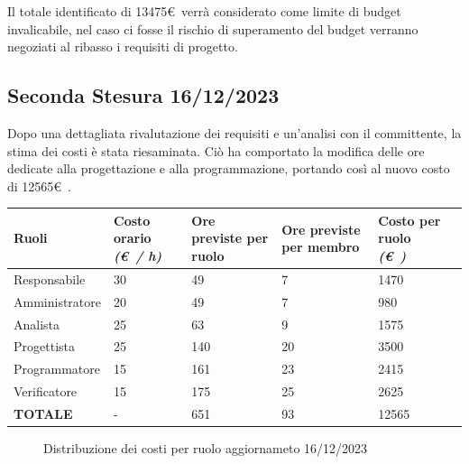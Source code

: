 \documentclass{article}
\begin{document}
    Il totale identificato di 13475\euro\ verrà considerato come limite di budget invalicabile,
    nel caso ci fosse il rischio di superamento del budget verranno negoziati al ribasso i requisiti
    di progetto.
\subsection{Seconda Stesura 16/12/2023}
Dopo una dettagliata rivalutazione dei requisiti e un'analisi con il committente, la stima dei costi è stata riesaminata. Ciò ha comportato la modifica delle ore dedicate alla progettazione e alla programmazione, portando così al nuovo costo di 12565\euro\ .
\begin{center}
        
    \begin{tabular}{|C{3cm}|C{2cm}|C{2cm}|C{2cm}|C{2cm}|C{2cm}|}
        \hline

        \textbf{Ruoli} & \textbf{Costo orario} \linebreak \textit{(\euro\ / h)} & \textbf{Ore previste per ruolo} & \textbf{Ore previste per membro} & \textbf{Costo per ruolo} \linebreak \textit{(\euro\ )} \\
        \hline\hline
        
        Responsabile & 30 & 49 & 7 & 1470 \\
        \hline
        
        Amministratore & 20 & 49 & 7 & 980 \\
        \hline
        
        Analista & 25 & 63 & 9 & 1575 \\
        \hline 
        
        Progettista & 25 & 140 & 20 & 3500 \\ 
        \hline
        
        Programmatore & 15 & 161 & 23 & 2415 \\
        \hline
        
        Verificatore & 15 & 175 & 25 & 2625 \\
        \hline\hline
        
        \textbf{TOTALE} & - & 651 & 93 & 12565 \\
        \hline
    \end{tabular}
    \end{center}

    \begin{figure}[h]
        \centering
        \caption{Distribuzione dei costi per ruolo aggiornameto 16/12/2023}
    \end{figure}
\end{document}
